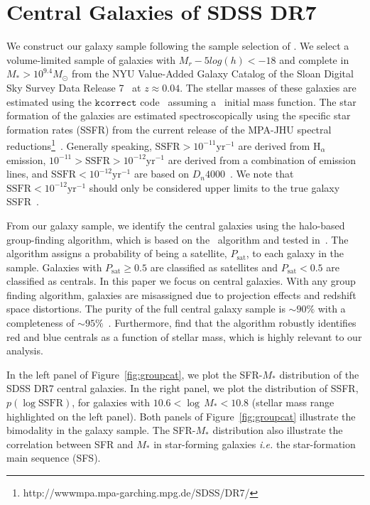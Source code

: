 \documentclass[12pt, letterpaper, preprint]{aastex}
\begin{document}
\section{Central Galaxies of SDSS DR7} \label{sec:sdss}
We construct our galaxy sample following the sample selection of \cite{tinker2011}. 
We select a volume-limited sample of galaxies with $M_r −5 log(h) < −18$ and complete in
$M_* > 10^{9.4} M_\odot$ from the NYU Value-Added Galaxy Catalog \citep[VAGC;][]{blanton2005}
of the Sloan Digital Sky Survey Data Release 7~\citep[SDSS DR7;][]{abazajian2009} at 
$z \approx 0.04$. The stellar masses of these galaxies are estimated using the
$\mathtt{kcorrect}$ code~\citep{blanton2007} assuming a~\cite{chabrier2003} initial
mass function. The star formation of the galaxies are estimated spectroscopically using the
specific star formation rates (SSFR) from the current release of the MPA-JHU spectral 
reductions\footnote{http://wwwmpa.mpa-garching.mpg.de/SDSS/DR7/}~\citep{brinchmann2004}.
Generally speaking, $\mathrm{SSFR} > 10^{-11}\mathrm{yr}^{-1}$ are derived from 
$\mathrm{H}_\alpha$ emission, $10^{-11} > \mathrm{SSFR} > 10^{-12}\mathrm{yr}^{-1}$
are derived from a combination of emission lines, and $\mathrm{SSFR} < 10^{-12}\mathrm{yr}^{-1}$
are based on $D_n 4000$~\citep[see discussion in][]{wetzel2013}. We note that 
$\mathrm{SSFR} < 10^{-12}\mathrm{yr}^{-1}$ should only be considered upper limits 
to the true galaxy SSFR~\citep{salim2007}.

From our galaxy sample, we identify the central galaxies using the \cite{tinker2011} halo-based 
group-finding algorithm, which is based on the~\cite{yang2005} algorithm and tested 
in~\cite{campbell2015}. The algorithm assigns a probability of being a satellite,
$P_\mathrm{sat}$, to each galaxy in the sample. Galaxies with $P_\mathrm{sat} \geq 0.5$ 
are classified as satellites and $P_\mathrm{sat} < 0.5$ are classified as centrals. 
In this paper we focus on central galaxies. With any group finding algorithm, galaxies are 
misassigned due to projection effects and redshift space distortions. The purity 
of the full central galaxy sample is $\sim 90\%$ with a completeness of $\sim 95\%$~\citep{tinker2017}.
Furthermore, \cite{campbell2015} find that the algorithm robustly identifies red and blue centrals
as a function of stellar mass, which is highly relevant to our analysis.  

In the left panel of Figure~\ref{fig:groupcat}, we plot the SFR-$M_*$ distribution of
the SDSS DR7 central galaxies. In the right panel, we plot the distribution of SSFR, 
$p(\log \mathrm{SSFR})$, for galaxies with $10.6 < \log \,M_* < 10.8$ (stellar mass range 
highlighted on the left panel). Both panels of Figure~\ref{fig:groupcat} illustrate the 
bimodality in the galaxy sample. The SFR-$M_*$ distribution also illustrate the correlation
between SFR and $M_*$ in star-forming galaxies \emph{i.e.} the star-formation main sequence 
(SFS).
\end{document}

